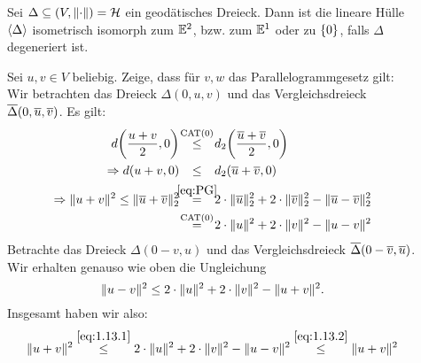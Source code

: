 \begin{beweis}
	\begin{description}
		\item[\bewrueck] Sei $\Delta \subseteq (V,\lVert\cdot\rVert) = \mathcal{H}$ ein geodätisches Dreieck.
		Dann ist die lineare Hülle $\langle\Delta\rangle$ isometrisch isomorph zum $\mathbb{E}^2$, bzw. zum $\mathbb{E}^1$ oder zu $\{0\}$, falls $\Delta$ degeneriert ist.
		\item[\bewhin] Sei $u,v \in V$ beliebig.
		Zeige, dass für $v,w$ das Parallelogrammgesetz gilt:
		Wir betrachten das Dreieck $\Delta(0,u,v)$ und das Vergleichsdreieck $\overline{\Delta}(0,\overline{u},\overline{v})$.
		Es gilt:
		\begin{align}
			d\enbrace*{\frac{u+v}{2},0} &\makebox[1cm][c]{$\stackrel{\CAT}{\leq}$} d_2\enbrace*{\frac{\ol{u}+\ol{v}}{2},0} \\
			\Rightarrow  d(u+v,0) &\makebox[1cm][c]{$\leq$} d_2(\ol{u}+\ol{v},0) \\
			\Rightarrow \Norm{u+v}^2 \leq \Norm{\ol{u}+\ol{v}}_2^2 &\makebox[1cm][c]{$\stackrel{\eqref{eq:PG}}{=}$} 2 \cdot \Norm{\ol{u}}_2^2 + 2 \cdot \Norm{\ol{v}}_2^2 - \Norm{\ol{u}-\ol{v}}_2^2 \\
			&\makebox[1cm][c]{$\stackrel{\CAT}{=}$} 2 \cdot \Norm{u}^2 + 2 \cdot \Norm{v}^2 - \Norm{u-v}^2 \label{eq:1.13.1}
		\end{align}
		Betrachte das Dreieck $\Delta(0-v,u)$ und das Vergleichsdreieck $\overline{\Delta}(0-\overline{v},\overline{u})$.
		Wir erhalten genauso wie oben die Ungleichung
		\begin{equation}
			\lVert u-v\rVert^2 \leq 2 \cdot \lVert u\rVert^2 + 2 \cdot \lVert v\rVert^2 - \lVert u+v\rVert^2. \label{eq:1.13.2}
		\end{equation}
		Insgesamt haben wir also:
		\[
			\lVert u+v\rVert^2 \stackrel{\eqref{eq:1.13.1}}{\leq} 2 \cdot \lVert u\rVert^2 + 2\cdot \lVert v\rVert^2 - \lVert u-v\rVert^2 \stackrel{\eqref{eq:1.13.2}}{\leq} \lVert u+v\rVert^2 
		\]
	\end{description}
\end{beweis}

\vspace*{.5cm}

